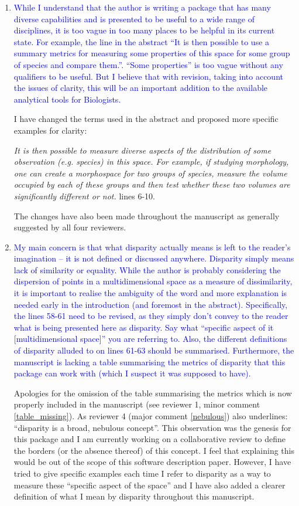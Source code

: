 \documentclass[12pt,letterpaper]{article}
\begin{document}
\begin{enumerate}

\item{\textcolor{blue}{While I understand that the author is writing a package that has many diverse capabilities and is presented to be useful to a wide range of disciplines, it is too vague in too many places to be helpful in its current state.
For example, the line in the abstract “It is then possible to use a summary metrics for measuring some properties of this space for some group of species and compare them.”.
“Some properties” is too vague without any qualifiers to be useful. But I believe that with revision, taking into account the issues of clarity, this will be an important addition to the available analytical tools for Biologists.}}

I have changed the terms used in the abstract and proposed more specific examples for clarity:

\textit{It is then possible to measure diverse aspects of the distribution of some observation (e.g. species) in this space. For example, if studying morphology, one can create a morphospace for two groups of species, measure the volume occupied by each of these groups and then test whether these two volumes are significantly different or not.} lines 6-10.

The changes have also been made throughout the manuscript as generally suggested by all four reviewers.

\item{\textcolor{blue}{My main concern is that what disparity actually means is left to the reader’s imagination – it is not defined or discussed anywhere.
Disparity simply means lack of similarity or equality.
While the author is probably considering the dispersion of points in a multidimensional space as a measure of dissimilarity, it is important to realise the ambiguity of the word and more explanation is needed early in the introduction (and foremost in the abstract).
Specifically, the lines 58-61 need to be revised, as they simply don’t convey to the reader what is being presented here as disparity.
Say what “specific aspect of it [multidimensional space]” you are referring to.
Also, the different definitions of disparity alluded to on lines 61-63 should be summarised.
Furthermore, the manuscript is lacking a table summarising the metrics of disparity that this package can work with (which I suspect it was supposed to have).}}
\label{define_disparity}

Apologies for the omission of the table summarising the metrics which is now properly included in the manuscript (see reviewer 1, minor comment \ref{table_missing}).
As reviewer 4 (major comment \ref{nebulous}) also underlines: ``disparity is a broad, nebulous concept''.
This observation was the genesis for this package and I am currently working on a collaborative review to define the borders (or the absence thereof) of this concept.
I feel that explaining this would be out of the scope of this software description paper.
However, I have tried to give specific examples each time I refer to disparity as a way to measure these ``specific aspect of the space'' and I have also added a clearer definition of what I mean by disparity throughout this manuscript.


\end{enumerate}
\end{document}
